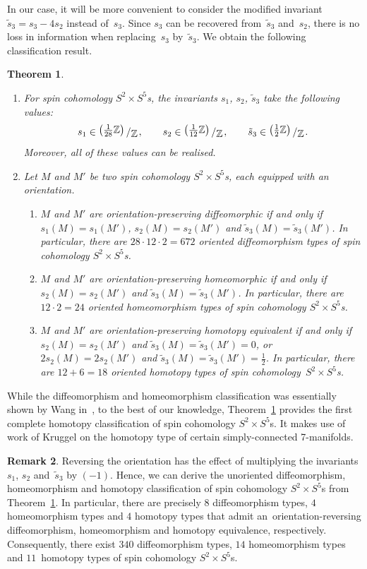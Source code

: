 \documentclass[10pt,a4paper]{amsart}
\numberwithin{equation}{section}
\newtheorem{Theorem}{Theorem}[section]
\theoremstyle{definition}
\newtheorem{Remark}[Theorem]{Remark}
\numberwithin{table}{section}
\newcommand{\Z}{\mathbb{Z}}
\newcommand{\bigslant}[2]{{\raisebox{.2em}{$#1$}\left/\raisebox{-.2em}{$#2$}\right.}}
\begin{document}
In our case, it will be more convenient to consider the modified invariant $\tilde{s}_3=s_3-4s_2$ instead of~$s_3$. Since $s_3$ can be recovered from~$\tilde{s}_3$ and~$s_2$, there is no loss in information when replacing~$s_3$ by~$\tilde{s}_3$. We obtain the following classification result.
\begin{Theorem}\label{T:class}\qquad
	\begin{enumerate}\itemsep=0pt
		\item[$(1)$] For spin cohomology $S^2\times S^5$s, the invariants $s_1$, $s_2$, $\tilde{s}_3$ take the following values:
		\[  s_1\in \bigslant{\bigl(\tfrac{1}{28}\Z\bigr)}{\Z}, \qquad s_2\in \bigslant{\bigl(\tfrac{1}{12}\Z\bigr)}{\Z}, \qquad \tilde{s}_3\in \bigslant{\bigl(\tfrac{1}{2}\Z\bigr)}{\Z}. \]
		Moreover, all of these values can be realised.
		\item[$(2)$] Let $M$ and $M'$ be two spin cohomology $S^2\times S^5$s, each equipped with an orientation.
		\begin{enumerate}\itemsep=0pt
			\item[$(a)$] $M$ and $M'$ are orientation-preserving diffeomorphic if and only if $s_1(M)=s_1(M')$, $s_2(M)=s_2(M')$ and $\tilde{s}_3(M)=\tilde{s}_3(M')$. In particular, there are $28\cdot 12\cdot 2=672$ oriented diffeomorphism types of spin cohomology $S^2\times S^5$s.
			\item[$(b)$] $M$ and $M'$ are orientation-preserving homeomorphic if and only if $s_2(M)=s_2(M')$ and $\tilde{s}_3(M)=\tilde{s}_3(M')$. In particular, there are $12\cdot 2=24$ oriented homeomorphism types of spin cohomology $S^2\times S^5$s.
			\item[$(c)$] $M$ and $M'$ are orientation-preserving homotopy equivalent if and only if $s_2(M)=s_2(M')$ and $\tilde{s}_3(M)=\tilde{s}_3(M')=0$, or $2s_2(M)=2s_2(M')$ and $\tilde{s}_3(M)=\tilde{s}_3(M')=\frac{1}{2}$. In particular, there are $12+6=18$ oriented homotopy types of spin cohomology~${S^2\times S^5}$s.
		\end{enumerate}
	\end{enumerate}
\end{Theorem}
While the diffeomorphism and homeomorphism classification was essentially shown by Wang in~\cite{Wa22}, to the best of our knowledge, Theorem~\ref{T:class} provides the first complete homotopy classification of spin cohomology $S^2\times S^5$s. It makes use of work of Kruggel \cite{Kr97,Kr98} on the homotopy type of certain simply-connected 7-manifolds.

\begin{Remark}\label{R:class_unor}
Reversing the orientation has the effect of multiplying the invariants $s_1$, $s_2$ and~$\tilde{s}_3$ by $(-1)$. Hence, we can derive the unoriented diffeomorphism, homeomorphism and homotopy classification of spin cohomology $S^2\times S^5$s from Theorem~\ref{T:class}. In particular, there are precisely $8$ diffeomorphism types, $4$ homeomorphism types and $4$ homotopy types that admit an~orientation-reversing diffeomorphism, homeomorphism and homotopy equivalence, respectively. Consequently, there exist $340$ diffeomorphism types, $14$ homeomorphism types and $11$~homotopy types of spin cohomology $S^2\times S^5$s.
\end{Remark}
\end{document}
